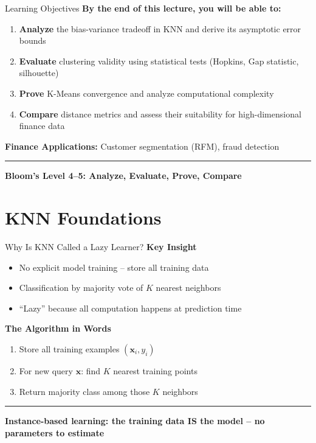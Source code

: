 \documentclass[8pt,aspectratio=169]{beamer}
\newcommand{\bottomnote}[1]{%
\vfill
\vspace{-2mm}
\textcolor{mllavender2}{\rule{\textwidth}{0.4pt}}
\vspace{1mm}
\footnotesize
\textbf{#1}
}
\newenvironment{compactlist}{%
  \begin{itemize}%
    \setlength{\itemsep}{2pt}%
    \setlength{\parskip}{0pt}%
    \setlength{\parsep}{0pt}%
}{%
  \end{itemize}%
}
\begin{document}
\begin{frame}[t]{Learning Objectives}
\textbf{By the end of this lecture, you will be able to:}
\begin{enumerate}
\item \textbf{Analyze} the bias-variance tradeoff in KNN and derive its asymptotic error bounds
\item \textbf{Evaluate} clustering validity using statistical tests (Hopkins, Gap statistic, silhouette)
\item \textbf{Prove} K-Means convergence and analyze computational complexity
\item \textbf{Compare} distance metrics and assess their suitability for high-dimensional finance data
\end{enumerate}
\vspace{0.5em}
\textbf{Finance Applications:} Customer segmentation (RFM), fraud detection
\bottomnote{Bloom's Level 4--5: Analyze, Evaluate, Prove, Compare}
\end{frame}

\section{KNN Foundations}

\begin{frame}[t]{Why Is KNN Called a Lazy Learner?}
\textbf{Key Insight}
\begin{compactlist}
\item No explicit model training -- store all training data
\item Classification by majority vote of $K$ nearest neighbors
\item ``Lazy'' because all computation happens at prediction time
\end{compactlist}
\vspace{0.5em}
\textbf{The Algorithm in Words}
\begin{enumerate}
\item Store all training examples $(\mathbf{x}_i, y_i)$
\item For new query $\mathbf{x}$: find $K$ nearest training points
\item Return majority class among those $K$ neighbors
\end{enumerate}
\bottomnote{Instance-based learning: the training data IS the model -- no parameters to estimate}
\end{frame}
\end{document}
